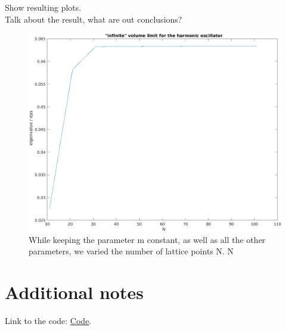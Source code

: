 \documentclass{article}
\begin{document}
Show resulting plots.\\
Talk about the result, what are out conclusions? \\
\begin{figure}
    \centering
    \includegraphics[scale = 0.7]{inf_volume_limit}
    \caption{While keeping the parameter m constant, as well as all the other parameters, we varied the number of lattice points N. N}
    \label{a0(1/A)}
\end{figure}


\clearpage
\section{Additional notes}
Link to the code: \hyperlink{https://github.com/carlulli/TISE}{Code}.

\end{document}
